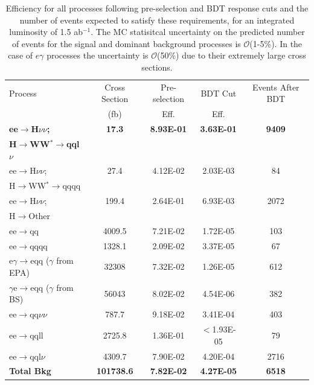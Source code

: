 \begin{table}
  \centering
  \begin{tabular}{l c c c c}
   \toprule
    Process & Cross Section & Pre-selection & BDT Cut  & Events After BDT     \\
    & (fb) & Eff. & Eff. &      \\
    \midrule
    \midrule
    \bf{ee$\rightarrow$H$\nu\nu$;}            & \bf{17.3}    &  \bf{8.93E-01}  & \bf{3.63E-01} & \bf{9409}    \\
    \bf{H$\rightarrow$WW$^*\rightarrow$qql$\nu$} & & & & \\
    \midrule
    \midrule
    ee$\rightarrow$H$\nu\nu$;  & 27.4    & 4.12E-02 & 2.03E-03 & 84  \\
    H$\rightarrow$WW$^*\rightarrow$qqqq & & & & \\
    ee$\rightarrow$H$\nu\nu$; & 199.4 & 2.64E-01 & 6.93E-03 & 2072 \\
    H$\rightarrow$Other & & & & \\
    \midrule
    \midrule
    ee$\rightarrow$qq               & 4009.5    & 7.21E-02 &  1.72E-05 & 103  \\ 
    ee$\rightarrow$qqqq               & 1328.1    &  2.09E-02 & 3.37E-05 & 67   \\ 
    e$\gamma$$\rightarrow$eqq ($\gamma$ from EPA)                 & 32308    & 7.32E-02  & 1.26E-05 & 612  \\ 
    $\gamma$e$\rightarrow$eqq ($\gamma$ from BS)               &  56043   & 8.02E-02 & 4.54E-06 & 382  \\ 
    ee$\rightarrow$qq$\nu\nu$               & 787.7    & 9.18E-02 & 3.41E-04 & 403   \\ 
    ee$\rightarrow$qqll               & 2725.8    & 1.36E-01  & $<$1.93E-05 & 79    \\ 
    ee$\rightarrow$qql$\nu$              & 4309.7    & 7.90E-02  & 4.20E-04 & 2716    \\ 
    \midrule
    \midrule
    \bf{Total Bkg}                    & \bf{101738.6} & \bf{7.82E-02} & \bf{4.27E-05} & \bf{6518} \\
    \midrule
    \bottomrule
  \end{tabular}
  \caption[Samples Used]{Efficiency for all processes following pre-selection and BDT response cuts and the number of events expected to satisfy these requirements, for an integrated luminosity of 1.5 ab$^{-1}$. The MC statisitcal uncertainty on the predicted number of events for the signal and dominant background processes is $\mathcal{O}$(1-5\%). In the case of $e\gamma$ processes the uncertainty is $\mathcal{O}$(50\%) due to their extremely large cross sections.}
  \label{tab:finalHiggsResults}

\end{table}

